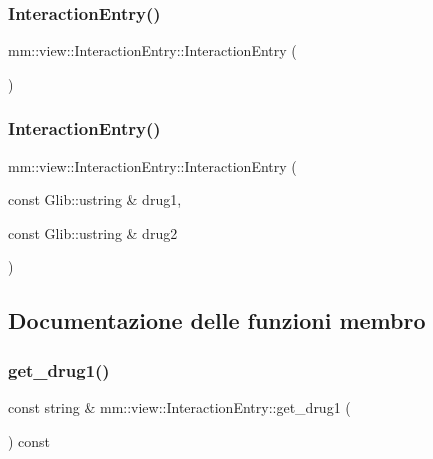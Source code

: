 \subsubsection{\texorpdfstring{Interaction\+Entry()}{InteractionEntry()}\hspace{0.1cm}{\footnotesize\ttfamily [1/2]}}
{\footnotesize\ttfamily mm\+::view\+::\+Interaction\+Entry\+::\+Interaction\+Entry (\begin{DoxyParamCaption}{ }\end{DoxyParamCaption})\hspace{0.3cm}{\ttfamily [delete]}}

\mbox{\label{classmm_1_1view_1_1_interaction_entry_a1e3a924b7b218109d2df6b4ebbc557f0}} 
\subsubsection{\texorpdfstring{Interaction\+Entry()}{InteractionEntry()}\hspace{0.1cm}{\footnotesize\ttfamily [2/2]}}
{\footnotesize\ttfamily mm\+::view\+::\+Interaction\+Entry\+::\+Interaction\+Entry (\begin{DoxyParamCaption}\item[{const Glib\+::ustring \&}]{drug1,  }\item[{const Glib\+::ustring \&}]{drug2 }\end{DoxyParamCaption})}



\subsection{Documentazione delle funzioni membro}
\mbox{\label{classmm_1_1view_1_1_interaction_entry_a1f579cbaf213f6e602e8d2b67109a1c2}} 
\subsubsection{\texorpdfstring{get\+\_\+drug1()}{get\_drug1()}}
{\footnotesize\ttfamily const string \& mm\+::view\+::\+Interaction\+Entry\+::get\+\_\+drug1 (\begin{DoxyParamCaption}{ }\end{DoxyParamCaption}) const}

